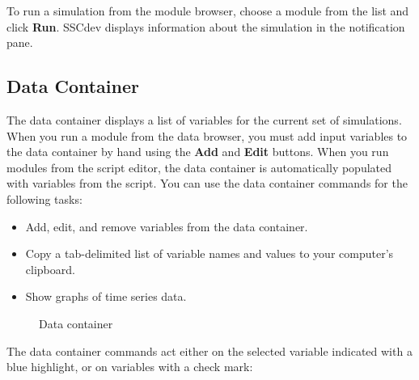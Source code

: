 \documentclass{article}
\begin{document}
To run a simulation from the module browser, choose a module from the list and click \textbf{Run}. SSCdev displays information about the simulation in the notification pane.

\subsection{Data Container}
\label{sec_data_container}

The data container displays a list of variables for the current set of simulations. When you run a module from the data browser, you must add input variables to the data container by hand using the \textbf{Add} and \textbf{Edit} buttons. When you run modules from the script editor, the data container is automatically populated with variables from the script. You can use the data container commands for the following tasks:

\begin{itemize}
\item Add, edit, and remove variables from the data container.
\item Copy a tab-delimited list of variable names and values to your computer's clipboard.
\item Show graphs of time series data.
\end{itemize}

\begin{figure}
\begin{center}
\end{center}
\caption{Data container}
\label{fig_data_container}
\end{figure}

The data container commands act either on the selected variable indicated with a blue highlight, or on variables with a check mark:
\end{document}
